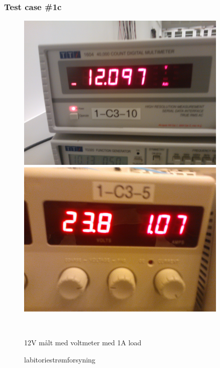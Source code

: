 \subsubsection{Test case \#1c}
\begin{figure}[htbp] \centering
\begin{minipage}[c]{0.48\textwidth} \centering
\includegraphics[width=0.9\textwidth]{billeder/12V_1A_meter.jpg} 
\end{minipage} \hfill
\begin{minipage}[c]{0.48\textwidth} \centering
\includegraphics[width=0.9\textwidth]{billeder/12V_1A_power.jpg} 
\end{minipage} \\ 
\begin{minipage}[b]{0.48\textwidth}
\caption{12V målt med voltmeter med 1A load} 
\label{fig:udgang_12V_1A}
\end{minipage} \hfill
\begin{minipage}[b]{0.48\textwidth}
\caption{labitoriestrømforsyning} 
\label{fig:forsyning_12V_1A_lab}
\end{minipage}
\end{figure}
\newpage
